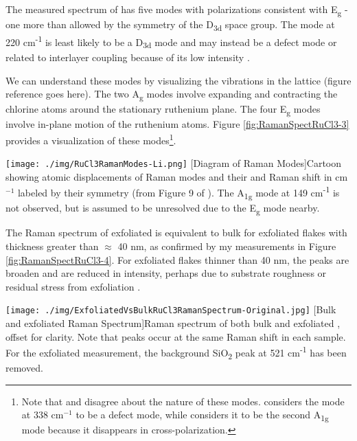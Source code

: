 The measured spectrum of \rucl has five modes with polarizations consistent with E\textsubscript{g} - one more than allowed by the symmetry of the D\textsubscript{3d} space group. The mode at 220 cm\textsuperscript{-1} is least likely to be a D\textsubscript{3d} mode and may instead be a defect mode or related to interlayer coupling because of its low intensity \cite{Sandilands2015}.

We can understand these modes by visualizing the vibrations in the lattice (figure reference goes here). The two A\textsubscript{g} modes involve expanding and contracting the chlorine atoms around the stationary ruthenium plane. The four E\textsubscript{g} modes involve in-plane motion of the ruthenium atoms. Figure \ref{fig:RamanSpectRuCl3-3} provides a visualization of these modes\footnote{Note that \cite{Li2019} and \cite{Sandilands2015} disagree about the nature of these modes. \cite{Li2019} considers the mode at 338 cm$^{-1}$ to be a defect mode, while \cite{Sandilands2015} considers it to be the second A\textsubscript{1g} mode because it disappears in cross-polarization.}.

\begin{centering}
\texttt{[image: ./img/RuCl3RamanModes-Li.png]}
  \captionsetup{width=0.75\textwidth}
  [Diagram of \rucl Raman Modes]{Cartoon showing atomic displacements of Raman modes and their and Raman shift in cm$^{-1}$ labeled by their symmetry (from Figure 9 of \cite{Li2019}). The A\textsubscript{1g} mode at 149 cm\textsuperscript{-1} is not observed, but is assumed to be unresolved due to the E\textsubscript{g} mode nearby.}
  \label{fig:RamanSpectRuCl3-3}
\end{centering}

The Raman spectrum of exfoliated \rucl is equivalent to bulk \rucl for exfoliated flakes with thickness greater than $\approx$ 40 nm, as confirmed by my measurements in Figure \ref{fig:RamanSpectRuCl3-4}. For exfoliated flakes thinner than 40 nm, the peaks are broaden and are reduced in intensity, perhaps due to substrate roughness or residual stress from exfoliation \cite{Zhou2018}.

\begin{centering}
\texttt{[image: ./img/ExfoliatedVsBulkRuCl3RamanSpectrum-Original.jpg]}
  \captionsetup{width=0.75\textwidth}
  [Bulk and exfoliated \rucl Raman Spectrum]{Raman spectrum of both bulk and exfoliated \ruclnospace , offset for clarity. Note that peaks occur at the same Raman shift in each sample. For the exfoliated measurement, the background SiO\textsubscript{2} peak at 521 cm\textsuperscript{-1} has been removed.}
  \label{fig:RamanSpectRuCl3-4}
\end{centering}

